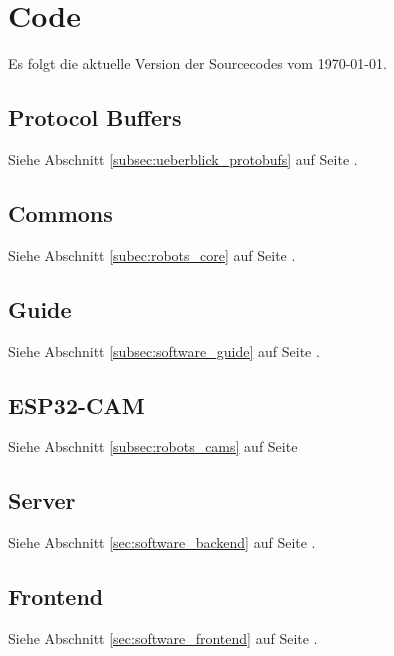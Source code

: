 \ExplSyntaxOff

\chapter{Code}
Es folgt die aktuelle Version der Sourcecodes vom \today.

\section{Protocol Buffers}
\label{lstsec:incl-protobuf}
Siehe Abschnitt \ref{subsec:ueberblick_protobufs} auf Seite \pageref{subsec:ueberblick_protobufs}.
\newline
{}

\section{Commons}
\label{lstsec:incl-commons}
Siehe Abschnitt \ref{subec:robots_core} auf Seite \pageref{subec:robots_core}.
\newline
{}

\section{Guide}
\label{lstsec:incl-guide}
Siehe Abschnitt \ref{subsec:software_guide} auf Seite \pageref{subsec:software_guide}.
\newline
{}


\section{ESP32-CAM}
\label{lstsec:incl-cam}
Siehe Abschnitt \ref{subsec:robots_cams} auf Seite \pageref{subsec:robots_cams}
\newline
{}

\section{Server}
\label{lstsec:incl-server}
Siehe Abschnitt \ref{sec:software_backend} auf Seite \pageref{sec:software_backend}.
\newline
{}

\section{Frontend}
\label{lstsec:incl-frontend}
Siehe Abschnitt \ref{sec:software_frontend} auf Seite \pageref{sec:software_frontend}.
\newline
{}

